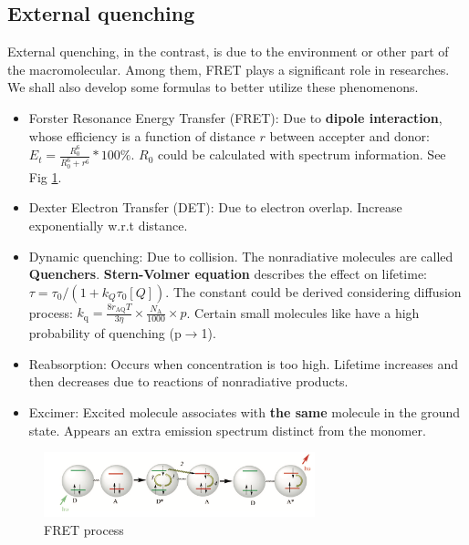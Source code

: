 \documentclass[12pt]{ctexart}
\begin{document}
\subsection*{External quenching}
External quenching, in the contrast, is due to the environment or other part of the macromolecular. Among them, FRET plays a significant role in researches. We shall also develop some formulas to better utilize these phenomenons.
\begin{itemize}
    \item Forster Resonance Energy Transfer (FRET): Due to \textbf{dipole interaction}, whose efficiency is a function of distance $r$ between accepter and donor: $E_t=\frac{R_0^6}{R_0^6+r^6}*100\%$. $R_0$ could be calculated with spectrum information. See Fig \ref{FRET}.
    \item Dexter Electron Transfer (DET): Due to electron overlap. Increase exponentially w.r.t distance.
    \item Dynamic quenching: Due to collision. The nonradiative molecules are called \textbf{Quenchers}. \textbf{Stern-Volmer equation} describes the effect on lifetime: $\tau=\tau_0/(1+k_Q\tau_0[Q])$. The constant could be derived considering diffusion process: $k_{\mathrm{q}}=\frac{8 r_{\mathrm{AQ}} T}{3 \eta} \times \frac{N_{\mathrm{A}}}{1000} \times p$. Certain small molecules like  have a high probability of quenching (p$\to$1).
    \item Reabsorption: Occurs when concentration is too high. Lifetime increases and then decreases due to reactions of nonradiative products.
    \item Excimer: Excited molecule associates with \textbf{the same} molecule in the ground state. Appears an extra emission spectrum distinct from the monomer.
\end{itemize}
\begin{figure}[t]
    \centering
    \includegraphics[width=0.7\textwidth]{FRET.png}
    \caption{FRET process}
    \label{FRET}
\end{figure}
\end{document}
